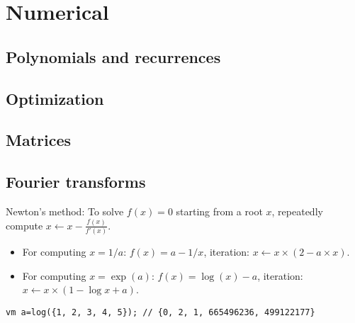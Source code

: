 \chapter{Numerical}

\section{Polynomials and recurrences}

\section{Optimization}

\section{Matrices}

\section{Fourier transforms}
	Newton's method: To solve $f(x) = 0$ starting from a root $x$, repeatedly compute
	$x \leftarrow x - \frac{f(x)}{f'(x)}$.
	\begin{itemize}
	  \item For computing $x=1/a$: $f(x) = a-1/x$, iteration: $x \leftarrow x\times (2-a\times x)$.
	  \item For computing $x=\exp(a)$: $f(x) = \log(x)-a$, iteration: $x \leftarrow x\times (1-\log x+a)$.
	\end{itemize}
\begin{lstlisting}
vm a=log({1, 2, 3, 4, 5}); // {0, 2, 1, 665496236, 499122177}
\end{lstlisting}
